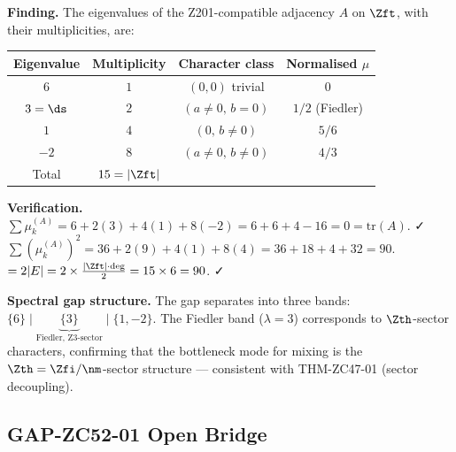 \documentclass[12pt, a4paper]{article}
\begin{document}
\begin{derivedbox}[title={FIND-ZC52-02: Complete Spectrum of
  $\mathbb{Z}_{15}$ Z201-Adjacency (Exact, $R_0$)}]
\textbf{Finding.}
The eigenvalues of the Z201-compatible adjacency $A$ on $\Zft$,
with their multiplicities, are:
\begin{center}
\begin{tabular}{@{}cccc@{}}
\toprule
Eigenvalue & Multiplicity & Character class & Normalised $\mu$ \\
\midrule
$6$ & $1$ & $(0,0)$ trivial & $0$ \\
$3 = \ds$ & $2$ & $(a\neq0,\,b=0)$ & $1/2$ (Fiedler) \\
$1$ & $4$ & $(0,\,b\neq0)$ & $5/6$ \\
$-2$ & $8$ & $(a\neq0,\,b\neq0)$ & $4/3$ \\
\midrule
Total & $15=|\Zft|$ & & \\
\bottomrule
\end{tabular}
\end{center}

\textbf{Verification.}
$\sum \mu_k^{(A)} = 6+2(3)+4(1)+8(-2) = 6+6+4-16 = 0 = \mathrm{tr}(A)$. ✓\\
$\sum (\mu_k^{(A)})^2 = 36+2(9)+4(1)+8(4) = 36+18+4+32 = 90$. \\
$= 2|E| = 2\times\frac{|\Zft|\cdot\deg}{2} = 15\times 6 = 90$. ✓

\textbf{Spectral gap structure.}
The gap separates into three bands:
$\{6\}\;\big|\;
 \underbrace{\{3\}}_{\text{Fiedler, Z3-sector}}\;\big|\;
 \{1,-2\}$.
The Fiedler band ($\lambda=3$) corresponds to
$\Zth$-sector characters, confirming that the bottleneck
mode for mixing is the $\Zth = \Zfi/\nm$-sector structure
--- consistent with THM-ZC47-01 (sector decoupling).
\end{derivedbox}

\subsection{GAP-ZC52-01 \quad Open Bridge}
\label{zc52:sec:gap}

\end{document}
